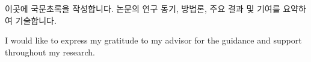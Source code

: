 \documentclass[master]{uos-thesis}
\begin{document}
\printbibliography[heading=bibintoc, title={Bibliography}]

% 

\backmatter

\begin{abstractko}

이곳에 국문초록을 작성합니다. 논문의 연구 동기, 방법론, 주요 결과 및 기여를
요약하여 기술합니다.

\end{abstractko}

\begin{acknowledgments}

I would like to express my gratitude to my advisor for the guidance
and support throughout my research.
\end{acknowledgments}
\end{document}
